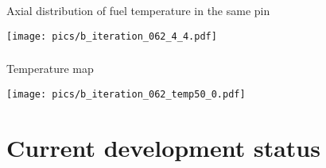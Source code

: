 \documentclass[t]{beamer}
\begin{document}
\begin{frame}\frametitle{\exResult}
    Axial distribution of fuel temperature in the same pin

    \texttt{[image: pics/b\_iteration\_062\_4\_4.pdf]}
\end{frame}

\begin{frame}\frametitle{\exResult}
    Temperature map

    \texttt{[image: pics/b\_iteration\_062\_temp50\_0.pdf]}
\end{frame}

\section{Current development status}
\end{document}
